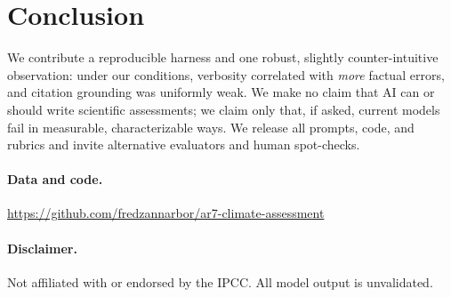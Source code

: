 \documentclass[11pt]{article}
\begin{document}
\section{Conclusion}
We contribute a reproducible harness and one robust, slightly counter-intuitive
observation: under our conditions, verbosity correlated with \emph{more} factual
errors, and citation grounding was uniformly weak. We make no claim that AI can or
should write scientific assessments; we claim only that, if asked, current models
fail in measurable, characterizable ways. We release all prompts, code, and rubrics
and invite alternative evaluators and human spot-checks.

\paragraph{Data and code.}
\url{https://github.com/fredzannarbor/ar7-climate-assessment}

\paragraph{Disclaimer.}
Not affiliated with or endorsed by the IPCC. All model output is unvalidated.



\end{document}
